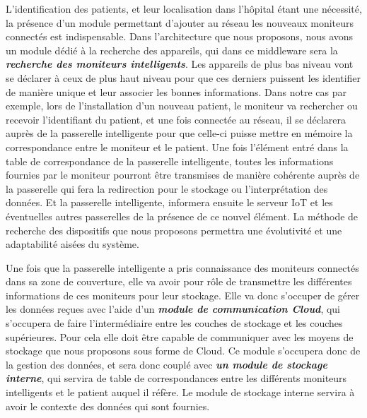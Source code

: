 L’identification des patients, et leur localisation dans l’hôpital étant une nécessité, la présence d’un module permettant d’ajouter au réseau les nouveaux moniteurs connectés est indispensable. Dans l’architecture que nous proposons, nous avons un module dédié à la recherche des appareils, qui dans ce middleware sera la \textbf{\textit{recherche des moniteurs intelligents}}. Les appareils de plus bas niveau vont se déclarer à ceux de plus haut niveau pour que ces derniers puissent les identifier de manière unique et leur associer les bonnes informations. Dans notre cas par exemple, lors de l’installation d’un nouveau patient, le moniteur va rechercher ou recevoir l’identifiant du patient, et une fois connectée au réseau, il se déclarera auprès de la passerelle intelligente pour que celle-ci puisse mettre en mémoire la correspondance entre le moniteur et le patient. Une fois l’élément entré dans la table de correspondance de la passerelle intelligente, toutes les informations fournies par le moniteur pourront être transmises de manière cohérente auprès de la passerelle qui fera la redirection pour le stockage ou l’interprétation des données. Et la passerelle intelligente, informera ensuite le serveur IoT et les éventuelles autres passerelles de la présence de ce nouvel élément. La méthode de recherche des dispositifs que nous proposons permettra une évolutivité et une adaptabilité aisées du système.\cite{li2015iot}

Une fois que la passerelle intelligente a pris connaissance des moniteurs connectés dans sa zone de couverture, elle va avoir pour rôle de transmettre les différentes informations de ces moniteurs pour leur stockage. Elle va donc s’occuper de gérer les données reçues avec l’aide d’un \textbf{\textit{module de communication Cloud}}, qui s’occupera de faire l’intermédiaire entre les couches de stockage et les couches supérieures. Pour cela elle doit être capable de communiquer avec les moyens de stockage que nous proposons sous forme de Cloud. Ce module s’occupera donc de la gestion des données, et sera donc couplé avec \textbf{\textit{un module de stockage interne}}, qui servira de table de correspondances entre les différents moniteurs intelligents et le patient auquel il réfère. Le module de stockage interne servira à avoir le contexte des données qui sont fournies.

